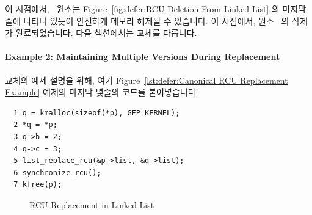 이 시점에서, ~원소는
Figure~\ref{fig:defer:RCU Deletion From Linked List} 의 마지막 줄에 나타나
있듯이 안전하게 메모리 해제될 수 있습니다.
이 시점에서, 원소~ 의 삭제가 완료되었습니다.
다음 섹션에서는 교체를 다룹니다.

\paragraph{Example 2: Maintaining Multiple Versions During Replacement}
\label{sec:defer:Example 2: Maintaining Multiple Versions During Replacement}

교체의 예제 설명을 위해, 여기
Figure~\ref{lst:defer:Canonical RCU Replacement Example} 예제의
마지막 몇줄의 코드를 붙여넣습니다:

\vspace{5pt}
\begin{minipage}[t]{\columnwidth}
\scriptsize
\begin{verbatim}
  1 q = kmalloc(sizeof(*p), GFP_KERNEL);
  2 *q = *p;
  3 q->b = 2;
  4 q->c = 3;
  5 list_replace_rcu(&p->list, &q->list);
  6 synchronize_rcu();
  7 kfree(p);
\end{verbatim}
\end{minipage}
\vspace{5pt}

\begin{figure}[tbp]
\begin{center}
\end{center}
\caption{RCU Replacement in Linked List}
\label{fig:defer:RCU Replacement in Linked List}
\end{figure}

